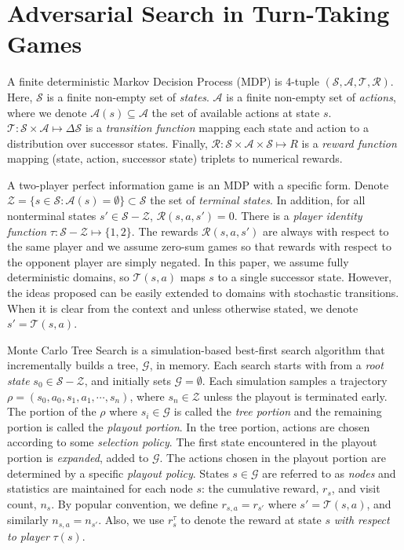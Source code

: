 \documentclass{article}
\newcommand{\cA}{\mathcal{A}}
\newcommand{\cG}{\mathcal{G}}
\newcommand{\cR}{\mathcal{R}}
\newcommand{\cS}{\mathcal{S}}
\newcommand{\cT}{\mathcal{T}}
\newcommand{\cZ}{\mathcal{Z}}
\begin{document}

\section{Adversarial Search in Turn-Taking Games}

A finite deterministic Markov Decision Process (MDP) is 4-tuple $(\cS, \cA, \cT, \cR)$. Here, $\cS$ is a finite non-empty set of {\it states}. 
$\cA$ is a finite non-empty set of {\it actions}, where we denote $\cA(s) \subseteq \cA$ the set of available actions at state $s$. 
$\cT : \cS \times \cA \mapsto \Delta \cS$ is a {\it transition function} mapping 
each state and action to a distribution over successor states. Finally, $\cR : \cS \times \cA \times \cS \mapsto R$ 
is a {\it reward function} mapping (state, action, successor state) triplets to numerical rewards. 

A two-player perfect information game is an MDP with a specific form.
Denote $\cZ = \{ s \in \cS: \cA(s) = \emptyset \} \subset \cS$ the set of {\it terminal states}. 
In addition, for all nonterminal states $s' \in \cS - \cZ$, $\cR(s,a,s') = 0$. 
There is a {\it player identity function} $\tau : \cS - \cZ \mapsto \{1,2\}$. 
The rewards $\cR(s,a,s')$ are always with respect to the same player and  
we assume zero-sum games so that rewards with respect to the opponent player are simply negated. 
In this paper, we assume fully deterministic domains, so $\cT(s,a)$ maps $s$ to a single successor 
state. 
However, the ideas proposed can be easily extended to domains with stochastic transitions. 
When it is clear from the context and unless otherwise stated, we denote $s' = \cT(s,a)$. 

Monte Carlo Tree Search is a simulation-based best-first search algorithm that incrementally builds a tree, $\cG$, 
in memory. 
Each search starts with from a {\it root state} $s_0 \in \cS - \cZ$, and initially sets $\cG = \emptyset$. 
Each simulation samples a trajectory $\rho = (s_0, a_0, s_1, a_1, \cdots, s_n)$, where $s_n \in \cZ$ unless the playout 
is terminated early. 
The portion of the $\rho$ where $s_i \in \cG$ is called the {\it tree portion} and the remaining portion is
called the {\it playout portion}. In the tree portion, actions are chosen according to some {\it selection policy}. 
The first state encountered in the playout portion is {\it expanded}, added to $\cG$.
The actions chosen in the playout portion are determined by a specific {\it playout policy}. 
States $s \in \cG$ are referred to as {\it nodes} and statistics are  
maintained for each node $s$: the cumulative reward, $r_s$, and visit count, $n_s$. 
By popular convention, we define $r_{s,a} = r_{s'}$ where $s' = \cT(s,a)$, and similarly $n_{s,a} = n_{s'}$. 
Also, we use $r^{\tau}_s$ to denote the reward at state $s$ {\it with respect to player} $\tau(s)$. 
\end{document}
